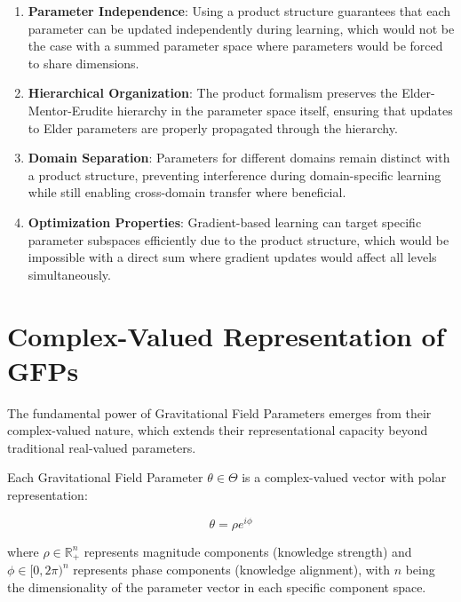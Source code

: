 \begin{definition}
\begin{enumerate}
    \item \textbf{Parameter Independence}: Using a product structure guarantees that each parameter can be updated independently during learning, which would not be the case with a summed parameter space where parameters would be forced to share dimensions.
    
    \item \textbf{Hierarchical Organization}: The product formalism preserves the Elder-Mentor-Erudite hierarchy in the parameter space itself, ensuring that updates to Elder parameters are properly propagated through the hierarchy.
    
    \item \textbf{Domain Separation}: Parameters for different domains remain distinct with a product structure, preventing interference during domain-specific learning while still enabling cross-domain transfer where beneficial.
    
    \item \textbf{Optimization Properties}: Gradient-based learning can target specific parameter subspaces efficiently due to the product structure, which would be impossible with a direct sum where gradient updates would affect all levels simultaneously.
\end{enumerate}
\end{definition}

\section{Complex-Valued Representation of GFPs}

The fundamental power of Gravitational Field Parameters emerges from their complex-valued nature, which extends their representational capacity beyond traditional real-valued parameters.

\begin{definition}
Each Gravitational Field Parameter $\theta \in \Theta$ is a complex-valued vector with polar representation:

\begin{equation}
\theta = \rho e^{i\phi}
\end{equation}

where $\rho \in \mathbb{R}^n_+$ represents magnitude components (knowledge strength) and $\phi \in [0, 2\pi)^n$ represents phase components (knowledge alignment), with $n$ being the dimensionality of the parameter vector in each specific component space.
\end{definition}

